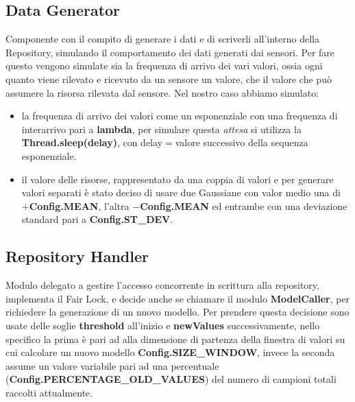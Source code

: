     \subsection{Data Generator}
      Componente con il compito di generare i dati e di scriverli all'interno della Repository, simulando il comportamento dei dati generati dai sensori. Per fare questo vengono simulate sia la frequenza di arrivo dei vari valori, ossia ogni quanto viene rilevato e ricevuto da un sensore un valore, che il valore che può assumere la risorsa rilevata dal sensore.\newline
      Nel nostro caso abbiamo simulato:
      \begin{itemize}
        \item la frequenza di arrivo dei valori come un esponenziale con una frequenza di interarrivo pari a \textbf{lambda}, per simulare questa \textit{attesa} si utilizza la \textbf{Thread.sleep(delay)}, con delay$=$valore successivo della sequenza esponenziale.
        \item il valore delle risorse, rappresentato da una coppia di valori e per generare valori separati è stato deciso di usare due Gaussiane con valor medio una di $+$\textbf{Config.MEAN}, l'altra $-$\textbf{Config.MEAN} ed entrambe con una deviazione standard pari a \textbf{Config.ST\_DEV}.
      \end{itemize}
      

    \subsection{Repository Handler}
      Modulo delegato a gestire l'accesso concorrente in scrittura alla repository, implementa il Fair Lock, e decide anche se chiamare il modulo \textbf{ModelCaller}, per richiedere la generazione di un nuovo modello. Per prendere questa decisione sono usate delle soglie \textbf{threshold} all'inizio e \textbf{newValues} successivamente, nello specifico la prima è pari ad alla dimensione di partenza della finestra di valori su cui calcolare un nuovo modello \textbf{Config.SIZE\_WINDOW}, invece la seconda assume un valore variabile pari ad una percentuale (\textbf{Config.PERCENTAGE\_OLD\_VALUES}) del numero di campioni totali raccolti attualmente.
      

